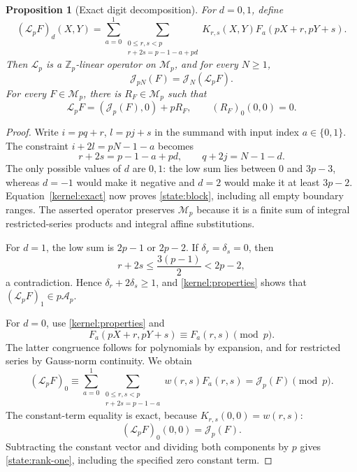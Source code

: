 \documentclass[11pt,a4paper]{article}
\newtheorem{proposition}[theorem]{Proposition}
\theoremstyle{remark}\newtheorem{remark}[theorem]{Remark}
\newcommand{\Z}{\mathbb Z}\newcommand{\Q}{\mathbb Q}
\begin{document}
\begin{proposition}[Exact digit decomposition]\label{state:operator}
For \(d=0,1\), define
\[
 (\mathcal L_pF)_d(X,Y)=
 \sum_{a=0}^1
 \sum_{\substack{0\le r,s<p\\r+2s=p-1-a+pd}}
 K_{r,s}(X,Y)F_a(pX+r,pY+s).
\]
Then \(\mathcal L_p\) is a \(\Z_p\)-linear operator on \(\mathcal M_p\),
and for every \(N\ge1\),
\begin{equation}\label{state:block}
               \mathcal J_{pN}(F)=\mathcal J_N(\mathcal L_pF).
\end{equation}
For every \(F\in\mathcal M_p\), there is \(R_F\in\mathcal M_p\) such that
\begin{equation}\label{state:rank-one}
 \mathcal L_pF=(\mathcal J_p(F),0)+pR_F,
 \qquad (R_F)_0(0,0)=0.
\end{equation}
\end{proposition}
\begin{proof}
Write \(i=pq+r\), \(l=pj+s\) in the summand with input index \(a\in\{0,1\}\).
The constraint \(i+2l=pN-1-a\) becomes
\[
 r+2s=p-1-a+pd,\qquad q+2j=N-1-d.
\]
The only possible values of \(d\) are \(0,1\): the low sum lies between
\(0\) and \(3p-3\), whereas \(d=-1\) would make it negative and
\(d=2\) would make it at least \(3p-2\).
Equation~\eqref{kernel:exact} now proves \eqref{state:block}, including
all empty boundary ranges. The asserted operator preserves
\(\mathcal M_p\) because it is a finite sum of integral restricted-series
products and integral affine substitutions.

For \(d=1\), the low sum is \(2p-1\) or \(2p-2\).
If \(\delta_r=\delta_s=0\), then
\[
 r+2s\le\frac{3(p-1)}2<2p-2,
\]
a contradiction. Hence \(\delta_r+2\delta_s\ge1\), and
\eqref{kernel:properties} shows that
\((\mathcal L_pF)_1\in p\mathcal A_p\).

For \(d=0\), use \eqref{kernel:properties} and
\[
 F_a(pX+r,pY+s)\equiv F_a(r,s)\pmod p.
\]
The latter congruence follows for polynomials by expansion, and for
restricted series by Gauss-norm continuity. We obtain
\[
 (\mathcal L_pF)_0\equiv
 \sum_{a=0}^1\sum_{\substack{0\le r,s<p\\r+2s=p-1-a}}
          w(r,s)F_a(r,s)=\mathcal J_p(F)\pmod p.
\]
The constant-term equality is exact, because
\(K_{r,s}(0,0)=w(r,s)\):
\[
                 (\mathcal L_pF)_0(0,0)=\mathcal J_p(F).
\]
Subtracting the constant vector and dividing both components by \(p\)
gives \eqref{state:rank-one}, including the specified zero constant term.
\end{proof}
\end{document}
